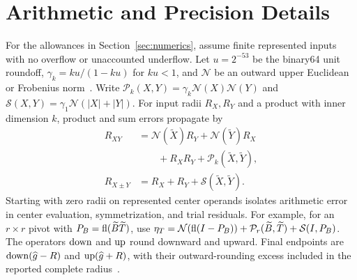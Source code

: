 \appendix
\section{Arithmetic and Precision Details}
\label{app:arithmetic}

For the allowances in Section~\ref{sec:numerics}, assume finite represented inputs with no overflow or unaccounted underflow. Let $u=2^{-53}$ be the binary64 unit roundoff, $\gamma_k=ku/(1-ku)$ for $ku<1$, and $\mathcal N$ be an outward upper Euclidean or Frobenius norm~\cite{Higham2002}. Write $\mathcal P_k(X,Y)=\gamma_k\mathcal N(X)\mathcal N(Y)$ and $\mathcal S(X,Y)=\gamma_1\mathcal N(|X|+|Y|)$. For input radii $R_X,R_Y$ and a product with inner dimension $k$, product and sum errors propagate by
\begin{equation}
 \begin{aligned}
 R_{XY}&=\mathcal N(\widetilde X)R_Y+\mathcal N(\widetilde Y)R_X\\
       &\qquad+R_XR_Y+\mathcal P_k(\widetilde X,\widetilde Y),\\
 R_{X\pm Y}&=R_X+R_Y+\mathcal S(\widetilde X,\widetilde Y).
 \end{aligned}
 \label{eq:rounding}
\end{equation}
Starting with zero radii on represented center operands isolates arithmetic error in center evaluation, symmetrization, and trial residuals. For example, for an $r\times r$ pivot with $P_B=\operatorname{fl}(\widetilde B\widetilde T)$, use $\eta_T=\mathcal N(\operatorname{fl}(I-P_B))+\mathcal P_r(\widetilde B,\widetilde T)+\mathcal S(I,P_B)$. The operators $\operatorname{down}$ and $\operatorname{up}$ round downward and upward. Final endpoints are $\operatorname{down}(\widehat g-R)$ and $\operatorname{up}(\widehat g+R)$, with their outward-rounding excess included in the reported complete radius~\cite{Rump2010}.

